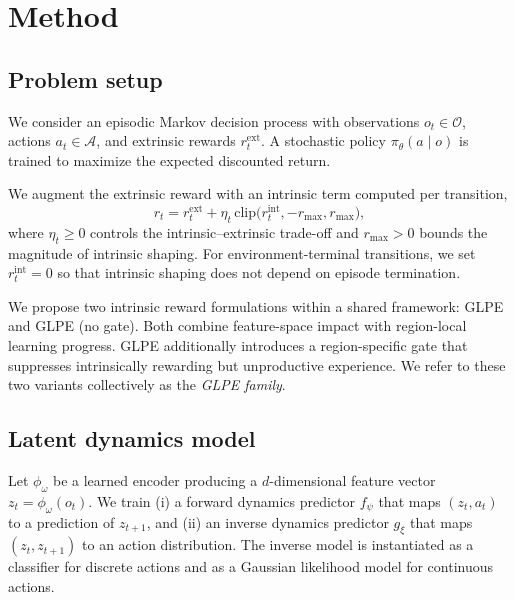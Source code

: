\section{Method}
\label{sec:method}

\subsection{Problem setup}

We consider an episodic Markov decision process with observations $o_t \in \mathcal{O}$, actions $a_t \in \mathcal{A}$, and extrinsic rewards $r_t^{\mathrm{ext}}$.
A stochastic policy $\pi_\theta(a\mid o)$ is trained to maximize the expected discounted return.

We augment the extrinsic reward with an intrinsic term computed per transition,
\begin{equation}
    r_t = r_t^{\mathrm{ext}} + \eta_t\,\mathrm{clip}\big(r_t^{\mathrm{int}}, -r_{\max}, r_{\max}\big),
\end{equation}
where $\eta_t\ge 0$ controls the intrinsic--extrinsic trade-off and $r_{\max}>0$ bounds the magnitude of intrinsic shaping.
For environment-terminal transitions, we set $r_t^{\mathrm{int}}=0$ so that intrinsic shaping does not depend on episode termination.

We propose two intrinsic reward formulations within a shared framework: GLPE and GLPE (no gate).
Both combine feature-space impact with region-local learning progress.
GLPE additionally introduces a region-specific gate that suppresses intrinsically rewarding but unproductive experience.
We refer to these two variants collectively as the \emph{GLPE family}.

\subsection{Latent dynamics model}

Let $\phi_\omega$ be a learned encoder producing a $d$-dimensional feature vector $z_t = \phi_\omega(o_t)$.
We train (i) a forward dynamics predictor $f_\psi$ that maps $(z_t,a_t)$ to a prediction of $z_{t+1}$, and (ii) an inverse dynamics predictor $g_\xi$ that maps $(z_t,z_{t+1})$ to an action distribution.
The inverse model is instantiated as a classifier for discrete actions and as a Gaussian likelihood model for continuous actions.

